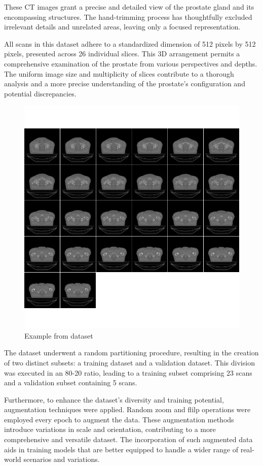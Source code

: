 \documentclass[11pt,a4paper]{report}
\begin{document}
These CT images grant a precise and detailed view of the prostate gland and its encompassing structures. The hand-trimming process has thoughtfully excluded irrelevant details and unrelated areas, leaving only a focused representation.

All scans in this dataset adhere to a standardized dimension of 512 pixels by 512 pixels, presented across 26 individual slices. This 3D arrangement permits a comprehensive examination of the prostate from various perspectives and depths. The uniform image size and multiplicity of slices contribute to a thorough analysis and a more precise understanding of the prostate's configuration and potential discrepancies.

\begin{figure}[H]
	\centering
	\includegraphics[scale=0.5]{images/datasetExample}
    \caption{Example from dataset}
\end{figure}
The dataset underwent a random partitioning procedure, resulting in the creation of two distinct subsets: a training dataset and a validation dataset. This division was executed in an 80-20 ratio, leading to a training subset comprising 23 scans and a validation subset containing 5 scans.

Furthermore, to enhance the dataset's diversity and training potential, augmentation techniques were applied. Random zoom and flilp operations were employed every epoch to augment the data. These augmentation methods introduce variations in scale and orientation, contributing to a more comprehensive and versatile dataset. The incorporation of such augmented data aids in training models that are better equipped to handle a wider range of real-world scenarios and variations.
\end{document}
